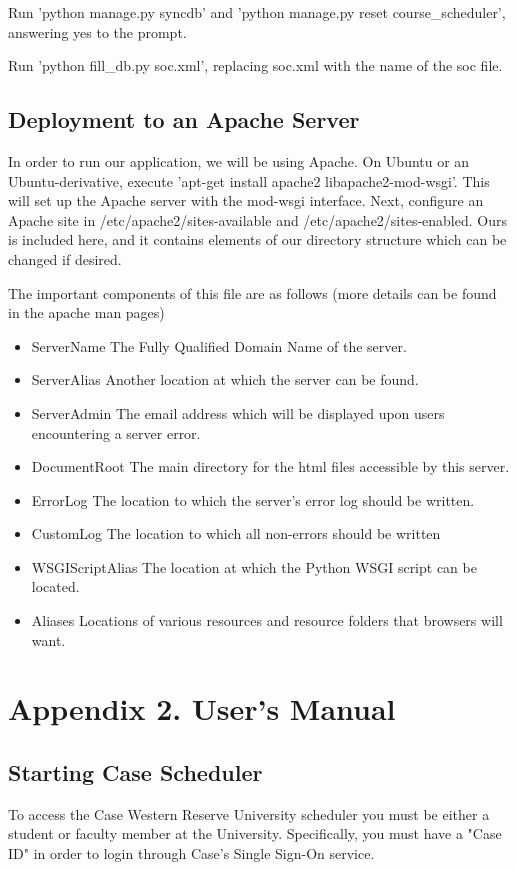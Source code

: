 \documentclass[pdftex,12pt,letter]{article}
\begin{document}
Run 'python manage.py syncdb' and 'python manage.py reset course\_scheduler', answering yes to the prompt.

Run 'python fill\_db.py soc.xml', replacing soc.xml with the name of the soc file.

\subsection{Deployment to an Apache Server}
In order to run our application, we will be using Apache. On Ubuntu or an Ubuntu-derivative, execute 'apt-get install apache2 libapache2-mod-wsgi'. This will set up the Apache server with the mod-wsgi interface. Next, configure an Apache site in /etc/apache2/sites-available and /etc/apache2/sites-enabled. Ours is included here, and it contains elements of our directory structure which can be changed if desired.

The important components of this file are as follows (more details can be found in the apache man pages)
\begin{itemize}
\item ServerName
\subitem The Fully Qualified Domain Name of the server.
\item ServerAlias
\subitem Another location at which the server can be found.
\item ServerAdmin
\subitem The email address which will be displayed upon users encountering a server error.
\item DocumentRoot
\subitem The main directory for the html files accessible by this server.
\item ErrorLog
\subitem The location to which the server's error log should be written.
\item CustomLog
\subitem The location to which all non-errors should be written
\item WSGIScriptAlias
\subitem The location at which the Python WSGI script can be located.
\item Aliases
\subitem Locations of various resources and resource folders that browsers will want.
\end{itemize}
\section{Appendix 2. User's Manual}
\subsection{Starting Case Scheduler}
To access the Case Western Reserve University scheduler you must be either  a student or faculty member at the University. Specifically, you must have a "Case ID" in order to login through Case's Single Sign-On service.\\
\end{document}
